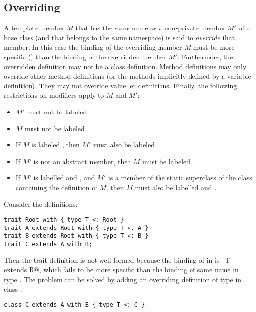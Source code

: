 \documentclass[a4paper,12pt,twoside,titlepage]{book}
\newcommand{\ifqualified}[1]{}
\begin{document}
\ifqualified{
\example\label{ex:compound-b}
Consider the definitions:
\begin{lstlisting}
qualified class Root extends Any with { def r1: Root, r2: Int }
qualified class A extends Root with { def r1: A, a: String }
qualified class B extends A with { def r1: B, b: Double }
\end{lstlisting}
Then ~\lstinline@A with B@~ has members
\lstinline@Root::r1@ of type \code{B}, \lstinline@Root::r2@ of type \code{Int},
\lstinline@A::a:@ of type \code{String}, and \lstinline@B::b@ of type \code{Double},
in addition to the members inherited from class \code{Any}.
}

\subsection{Overriding}
\label{sec:overriding}

A template member $M$ that has the same \ifqualified{qualified}
name as a non-private member $M'$ of a base class (and that
belongs to the same namespace) is said to {\em override} that member.
In this case the binding of the overriding member $M$ must be
more specific () than the binding of the
overridden member $M'$.  Furthermore, the overridden definition
may not be a class definition.  Method definitions may only override
other method definitions (or the methods implicitly defined by a
variable definition). They may not override value let definitions.
Finally, the following restrictions on modifiers apply to $M$ and
$M'$:
\begin{itemize}
\item
$M'$ must not be labeled .
\item
$M$ must not be labeled .
\item
If $M$ is labeled , then $M'$ must also be
labeled .
\item
If $M'$ is not an abstract member, then
$M$ must be labeled .
\item
If $M'$ is labelled  and , and $M'$ is a
member of the static superclass of the class containing the definition
of $M$, then $M$ must also be labelled  and
.
\end{itemize}

\example\label{ex:compound-a}
Consider the definitions:
\begin{lstlisting}
trait Root with { type T <: Root }
trait A extends Root with { type T <: A }
trait B extends Root with { type T <: B }
trait C extends A with B;
\end{lstlisting}
Then the trait definition  is not well-formed because the
binding of  in  is
~\lstinline@type T extends B@,
which fails to be more specific than the binding of same name in type
. The problem can be solved by adding an overriding 
definition of type  in class :
\begin{lstlisting}
class C extends A with B { type T <: C }
\end{lstlisting}
\end{document}
